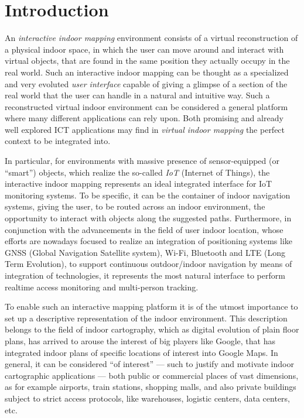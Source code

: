 \section{Introduction}\label{introduction}

An \emph{interactive indoor mapping} environment consists of a virtual reconstruction
of a physical indoor space, in which the user can move around and interact
with virtual objects, that are found in the same position they actually occupy in the
real world. Such an interactive indoor mapping can be thought as a specialized
and very evoluted \emph{user interface} capable of giving a glimpse of a section of
the real world that the user can handle in a natural and intuitive way. Such
a reconstructed virtual indoor environment can be considered a general
platform where many different applications can rely upon. Both promising and
already well explored ICT applications may find in \emph{virtual indoor mapping} the
perfect context to be integrated into.

In particular, for environments with massive presence of sensor-equipped (or
``smart'') objects, which realize the so-called \emph{IoT} (Internet of
Things), the interactive indoor mapping represents an ideal integrated
interface for IoT monitoring systems. To be specific, it can be the container
of indoor navigation systems, giving the user, to be routed across an indoor
environment, the opportunity to interact with objects along the suggested
paths. Furthermore, in conjunction with the advancements in the field of user
indoor location, whose efforts are nowadays focused to realize an integration
of positioning systems like GNSS (Global Navigation Satellite system), Wi-Fi,
Bluetooth and LTE (Long Term Evolution), to support continuous outdoor/indoor
navigation by means of integration of technologies, it represents the most
natural interface to perform realtime access monitoring and multi-person
tracking.

To enable such an interactive mapping platform it is of the utmost importance
to set up  a descriptive representation of the indoor environment. 
 This description belongs to  the field of indoor cartography,
which as digital evolution of plain floor plans, has arrived to arouse the
interest of big players like Google, that has integrated indoor plans of
specific locations of interest \cite{indoormaps} into Google Maps. In general,
it can be considered ``of interest'' --- such to justify and motivate indoor
cartographic applications --- both public or commercial places of vast
dimensions, as for example airports, train stations, shopping malls, and also
private buildings subject to strict access protocols, like warehouses,
logistic centers, data centers, etc.

